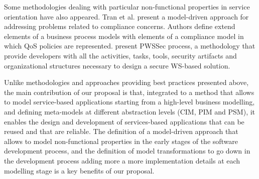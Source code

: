 Some methodologies dealing with particular non-functional properties in service orientation have also appeared. Tran et al. \cite{Tran2012531} present a model-driven approach for addressing problems related to compliance concerns. Authors define extend elements of a business process models with elements of a compliance model in which QoS policies are represented.\cite{GutierrezRF10} present PWSSec process, a methodology that provide developers with all the activities, tasks, tools, security artifacts and organizational structures necessary to design a secure WS-based solution.

Unlike methodologies and approaches providing best practices presented above, the main contribution of our proposal is that, integrated to a method that allows to model service-based applications starting from a high-level business modelling, and defining meta-models at different abstraction levels (CIM, PIM and PSM), it enables the design and development of services-based applications that can be reused and that are reliable. The definition of a model-driven approach that allows to model non-functional properties in the early stages of the software development process, and the definition of model transformations to go down in the development process adding more a more implementation details at each modelling stage is a key benefits of our proposal.



